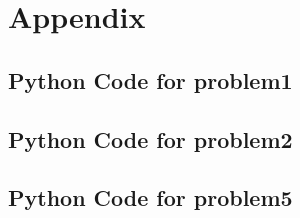 \section{Appendix}
\subsection*{Python Code for problem1}


\subsection*{Python Code for problem2}


\subsection*{Python Code for problem5}

